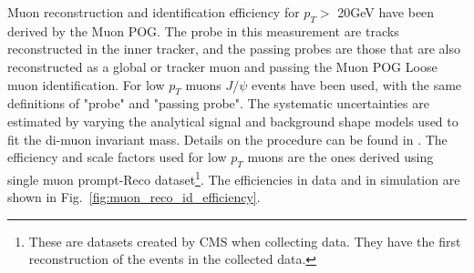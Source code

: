 Muon reconstruction and identification efficiency for $p_{T}>$ 20GeV have been derived by the Muon POG. The probe in this measurement are tracks reconstructed in the inner tracker, and the passing probes are those that are also reconstructed as a global or tracker muon and passing the Muon POG Loose muon identification. For low $p_{T}$ muons $J/\psi$ events have been used, with the same definitions of
"probe" and "passing probe". The systematic uncertainties are estimated by varying the analytical signal and background shape models used to fit the di-muon invariant mass. Details on the procedure can be found in \cite{bib:CMS-AN-15-277}. The efficiency and scale factors used for low $p_{T}$ muons
are the ones derived using single muon prompt-Reco dataset\footnote{These are datasets created by CMS when collecting data. They have the first reconstruction of the events in the collected data.}. The efficiencies in data and in simulation are shown in Fig.~\ref{fig:muon_reco_id_efficiency}.

